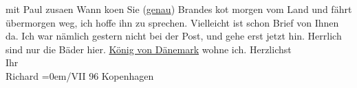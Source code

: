 \begin{ledgroupsized}[t]{13cm}
               mit Paul zusa{\geminationm}en\pend
           \pstart
           Wann ko{\geminationm}en Sie (\uline{genau})\pend
           \pstart
           Brandes ko{\geminationm}t morgen
               vom Land und fährt übermorgen weg, ich hoffe ihn zu sprechen. Vielleicht ist schon
               Brief von Ihnen da. {\pb}Ich war
               nämlich gestern nicht bei der Post, und gehe erst jetzt hin. Herrlich sind nur die
               Bäder hier. \uline{König von Dänemark} wohne ich.\pend
           \pstart
           Herzlichst{\\[\baselineskip]}Ihr{\\[\baselineskip]}\spacefill\mbox{Richard}\pend
           \leftskip=0em{}/VII 96{ }Kopenhagen\pend
           
         
         \endnumbering{}\end{ledgroupsized}  \newcommand{\dateiname}{L00570}\newcommand{\titel}{Richard Beer-Hofmann an Arthur Schnitzler, 28. 7. 1896}\newcommand{\editorInnen}{Martin Anton Müller und Gerd-Hermann Susen}
      